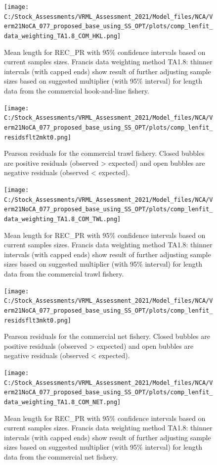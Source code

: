 \documentclass[11pt,
  english,
  a4paper,
]{article}
\begin{document}
\begin{figure}
\centering
\texttt{[image: C:/Stock\_Assessments/VRML\_Assessment\_2021/Model\_files/NCA/Verm21NoCA\_077\_proposed\_base\_using\_SS\_OPT/plots/comp\_lenfit\_data\_weighting\_TA1.8\_COM\_HKL.png]}
\caption{Mean length for REC\_PR with 95\% confidence intervals based on current samples sizes. Francis data weighting method TA1.8: thinner intervals (with capped ends) show result of further adjusting sample sizes based on suggested multiplier (with 95\% interval) for length data from the commercial hook-and-line fishery.\label{fig:mean-len-fit-COM-HKL}}
\end{figure}

\begin{figure}
\centering
\texttt{[image: C:/Stock\_Assessments/VRML\_Assessment\_2021/Model\_files/NCA/Verm21NoCA\_077\_proposed\_base\_using\_SS\_OPT/plots/comp\_lenfit\_residsflt2mkt0.png]}
\caption{Pearson residuals for the commercial trawl fishery. Closed bubbles are positive residuals (observed \textgreater{} expected) and open bubbles are negative residuals (observed \textless{} expected).\label{fig:len-pearson-COM-TWL}}
\end{figure}

\begin{figure}
\centering
\texttt{[image: C:/Stock\_Assessments/VRML\_Assessment\_2021/Model\_files/NCA/Verm21NoCA\_077\_proposed\_base\_using\_SS\_OPT/plots/comp\_lenfit\_data\_weighting\_TA1.8\_COM\_TWL.png]}
\caption{Mean length for REC\_PR with 95\% confidence intervals based on current samples sizes. Francis data weighting method TA1.8: thinner intervals (with capped ends) show result of further adjusting sample sizes based on suggested multiplier (with 95\% interval) for length data from the commercial trawl fishery.\label{fig:mean-len-fit-COM-TWL}}
\end{figure}

\begin{figure}
\centering
\texttt{[image: C:/Stock\_Assessments/VRML\_Assessment\_2021/Model\_files/NCA/Verm21NoCA\_077\_proposed\_base\_using\_SS\_OPT/plots/comp\_lenfit\_residsflt3mkt0.png]}
\caption{Pearson residuals for the commercial net fishery. Closed bubbles are positive residuals (observed \textgreater{} expected) and open bubbles are negative residuals (observed \textless{} expected).\label{fig:len-pearson-COM-NET}}
\end{figure}

\begin{figure}
\centering
\texttt{[image: C:/Stock\_Assessments/VRML\_Assessment\_2021/Model\_files/NCA/Verm21NoCA\_077\_proposed\_base\_using\_SS\_OPT/plots/comp\_lenfit\_data\_weighting\_TA1.8\_COM\_NET.png]}
\caption{Mean length for REC\_PR with 95\% confidence intervals based on current samples sizes. Francis data weighting method TA1.8: thinner intervals (with capped ends) show result of further adjusting sample sizes based on suggested multiplier (with 95\% interval) for length data from the commercial net fishery.\label{fig:mean-len-fit-COM-NET}}
\end{figure}
\end{document}
